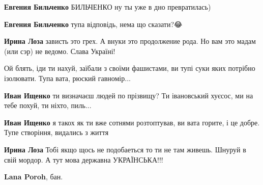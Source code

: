 \begin{itemize}
\begin{itemize}

\textbf{Евгения Бильченко} БИЛЬЧЕНКО ну ты уже в дно превратилась)


\textbf{Евгения Бильченко} тупа відповідь, нема що сказати?😂


\textbf{Ирина Лоза} зависть это грех. А внуки это продолжение рода. Но вам это мадам (или сэр) не ведомо. Слава Україні!


Ой блять, іди ти нахуй, заїбали з своїми фашистами, ви тупі суки яких потрібно ізолювати. Тупа вата, рюский гавномір...


\textbf{Иван Ищенко} ти визначаєш людей по прізвищу? Ти івановський хуєсос, ми на тебе похуй, ти ніхто, пиль...


\textbf{Иван Ищенко} я такох як ти вже сотнями розтоптував, ви вата горите, і це добре. Тупе створіння, видались з життя


\textbf{Ирина Лоза} Тобі якщо щось не подобаеться то ти не там живешь. Шнуруй в свій мордор. А тут мова державна УКРАЇНСЬКА!!!


\textbf{Lana Poroh}, бан.

\end{itemize}




\end{itemize}
